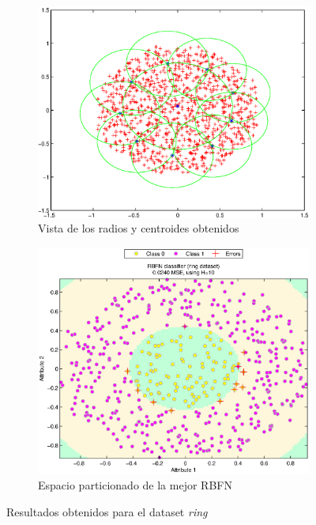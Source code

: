 \documentclass[journal]{IEEEtran}
\begin{document}


\begin{figure}
\centering
    \begin{subfigure}[b]{0.5\textwidth}            
            \includegraphics[width=\textwidth]{imagenes/ring-centroids}
            \caption{Vista de los radios y centroides obtenidos}
            \label{fig:ring-centroids}
    \end{subfigure}%
    \begin{subfigure}[b]{0.5\textwidth}
            \centering
            \includegraphics[width=\textwidth]{imagenes/ring}
            \caption{Espacio particionado de la mejor RBFN}
            \label{fig:ring-partition}
    \end{subfigure}
    \caption{Resultados obtenidos para el dataset \emph{ring}}\label{fig:espacio-particionado-ring}
\end{figure}
\end{document}
